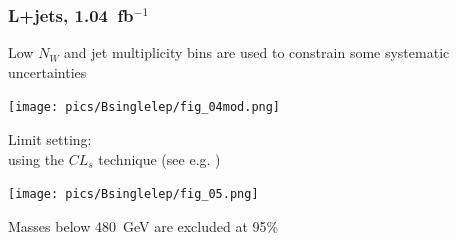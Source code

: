 \documentclass[xcolor=dvipsnames,10pt]{beamer}
\newcommand{\ifb}{~fb$^{-1}$}
\begin{document}
\begin{frame}\frametitle{L+jets, 1.04\ifb~\cite{ATLAS:2012aw}} %
\footnotesize\centering

\begin{minipage}{.4\textwidth}
\centering


\scriptsize

Low $N_W$ and jet multiplicity bins are used to \alert{constrain} some systematic uncertainties

\texttt{[image: pics/Bsinglelep/fig\_04mod.png]}

Limit setting:\\
using the $CL_s$ technique (see e.g. \cite{Junk:1999kv,Read:2002hq})\\

\vspace{\baselineskip}

\end{minipage}\begin{minipage}{.6\textwidth}
\centering

\texttt{[image: pics/Bsinglelep/fig\_05.png]}

Masses below \alert{480~GeV} are excluded at 95\%

\end{minipage}

\end{frame}
\end{document}
